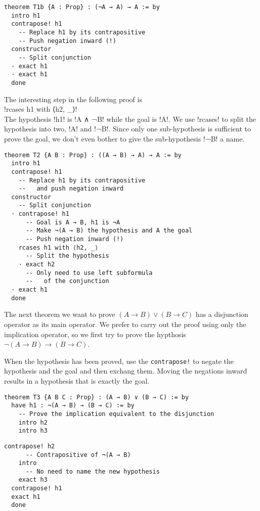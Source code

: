 \begin{Verbatim}[firstnumber=last]
theorem T1b {A : Prop} : (¬A → A) → A := by
  intro h1
  contrapose! h1
    -- Replace h1 by its contrapositive
    -- Push negation inward (!)
  constructor
    -- Split conjunction
  · exact h1
  · exact h1
  done
\end{Verbatim}


The interesting step in the following proof is \\
\indnt{}!rcases h1 with ⟨h2, _⟩!\\
The hypothesis !h1! is !A ∧ ¬B! while the goal is !A!. We use !rcases! to split the hypothesis into two, !A! and !¬B!. Since only one sub-hypothesis is sufficient to prove the goal, we don't even bother to give the sub-hypothesis !¬B! a name.
\begin{Verbatim}[firstnumber=last]
theorem T2 {A B : Prop} : ((A → B) → A) → A := by
  intro h1
  contrapose! h1
    -- Replace h1 by its contrapositive
    --   and push negation inward
  constructor
    -- Split conjunction
  · contrapose! h1
      -- Goal is A → B, h1 is ¬A
      -- Make ¬(A → B) the hypothesis and A the goal
      -- Push negation inward (!)
    rcases h1 with ⟨h2, _⟩
      -- Split the hypothesis
    · exact h2
      -- Only need to use left subformula
      --   of the conjunction
  · exact h1
  done
\end{Verbatim}


The next theorem we want to prove $(A\rightarrow B) \vee (B \rightarrow C)$ has a disjunction operator as its main operator. We prefer to carry out the proof using only the implication operator, so we first try to prove the hypthosis $\neg(A\rightarrow B) \rightarrow (B \rightarrow C)$.

When the hypothesis has been proved, use the \Verb+contrapose!+ to negate the hypothesis and the goal and then exchang them. Moving the negations inward results in a hypothesis that is exactly the goal.
\begin{Verbatim}[firstnumber=last]
theorem T3 {A B C : Prop} : (A → B) ∨ (B → C) := by
  have h1 : ¬(A → B) → (B → C) := by
    -- Prove the implication equivalent to the disjunction
    intro h2
    intro h3
\end{Verbatim}
\begin{Verbatim}[firstnumber=last]
    contrapose! h2
      -- Contrapositive of ¬(A → B)
    intro
      -- No need to name the new hypothesis
    exact h3
  contrapose! h1
  exact h1
  done
\end{Verbatim}

